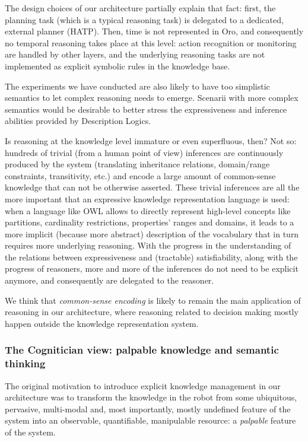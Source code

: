 \documentclass[letterpaper, 10 pt, conference]{ieeeconf}  %
\begin{document}
The design choices of our architecture partially explain that fact: first, the
planning task (which is a typical reasoning task) is delegated to a
dedicated, external planner (HATP). Then, time is not represented in {\sc Oro}, and
consequently no temporal reasoning takes place at this level: action
recognition or monitoring are handled by other layers, and the underlying
reasoning tasks are not implemented as explicit symbolic rules in the knowledge
base.

The experiments we have conducted are also likely to have too simplistic
semantics to let complex reasoning needs to emerge. Scenarii with more complex
semantics would be desirable to better stress the expressiveness and inference
abilities provided by Description Logics.

Is reasoning at the knowledge level immature or even superfluous, then? Not so:
hundreds of trivial (from a human point of view) inferences are continuously
produced by the system (translating inheritance relations, domain/range
constraints, transitivity, etc.) and encode a large amount of common-sense
knowledge that can not be otherwise asserted. These trivial inferences are all
the more important that an expressive knowledge representation language is
used: when a language like OWL allows to directly represent high-level concepts
like partitions, cardinality restrictions, properties' ranges and domains, it
leads to a more implicit (because more abstract) description of the vocabulary
that in turn requires more underlying reasoning. With the progress in the
understanding of the relations between expressiveness and (tractable)
satisfiability, along with the progress of reasoners, more and more of the
inferences do not need to be explicit anymore, and consequently are delegated
to the reasoner.

We think that \emph{common-sense encoding} is likely to remain the main
application of reasoning in our architecture, where reasoning related
to decision making mostly happen outside the knowledge representation system.


\subsubsection{The Cognitician view: palpable knowledge and semantic thinking}

The original motivation to introduce explicit knowledge management in our
architecture was to transform the knowledge in the robot from some ubiquitous,
pervasive, multi-modal and, most importantly, mostly undefined feature of the
system into an observable, quantifiable, manipulable resource: a
\emph{palpable} feature of the system.
\end{document}
